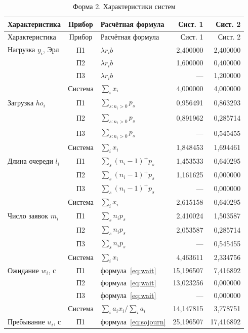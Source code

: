 \begin{longtable}{p{3.6cm}cp{4.2cm}rr}
\caption{Форма 2. Характеристики систем}\label{tab:metrics}\\
\hline Характеристика & Прибор & Расчётная формула & Сист. 1 & Сист. 2 \\ \hline\endfirsthead
\hline Характеристика & Прибор & Расчётная формула & Сист. 1 & Сист. 2 \\ \hline\endhead
Нагрузка $y_i$, Эрл & П1 & $\lambda r_i b$ & 2{,}400000 & 2{,}400000 \\
 & П2 & $\lambda r_i b$ & 1{,}600000 & 0{,}400000 \\
 & П3 & $\lambda r_i b$ & --- & 1{,}200000 \\
 & Система & $\sum_i x_i$ & 4{,}000000 & 4{,}000000 \\ \hline
Загрузка $
ho_i$ & П1 & $\sum_{s:n_i>0}p_s$ & 0{,}956491 & 0{,}863293 \\
 & П2 & $\sum_{s:n_i>0}p_s$ & 0{,}891962 & 0{,}285714 \\
 & П3 & $\sum_{s:n_i>0}p_s$ & --- & 0{,}545455 \\
 & Система & $\sum_i x_i$ & 1{,}848453 & 1{,}694461 \\ \hline
Длина очереди $l_i$ & П1 & $\sum_s(n_i-1)^+p_s$ & 1{,}453533 & 0{,}640295 \\
 & П2 & $\sum_s(n_i-1)^+p_s$ & 1{,}161625 & 0{,}000000 \\
 & П3 & $\sum_s(n_i-1)^+p_s$ & --- & 0{,}000000 \\
 & Система & $\sum_i x_i$ & 2{,}615158 & 0{,}640295 \\ \hline
Число заявок $m_i$ & П1 & $\sum_s n_i p_s$ & 2{,}410024 & 1{,}503587 \\
 & П2 & $\sum_s n_i p_s$ & 2{,}053587 & 0{,}285714 \\
 & П3 & $\sum_s n_i p_s$ & --- & 0{,}545455 \\
 & Система & $\sum_i x_i$ & 4{,}463611 & 2{,}334756 \\ \hline
Ожидание $w_i$, с & П1 & формула~\eqref{eq:wait} & 15{,}196507 & 7{,}416892 \\
 & П2 & формула~\eqref{eq:wait} & 13{,}023256 & 0{,}000000 \\
 & П3 & формула~\eqref{eq:wait} & --- & 0{,}000000 \\
 & Система & $\sum_i a_i x_i/\sum_i a_i$ & 14{,}147815 & 3{,}778751 \\ \hline
Пребывание $u_i$, с & П1 & формула~\eqref{eq:sojourn} & 25{,}196507 & 17{,}416892 \\

\end{longtable}
